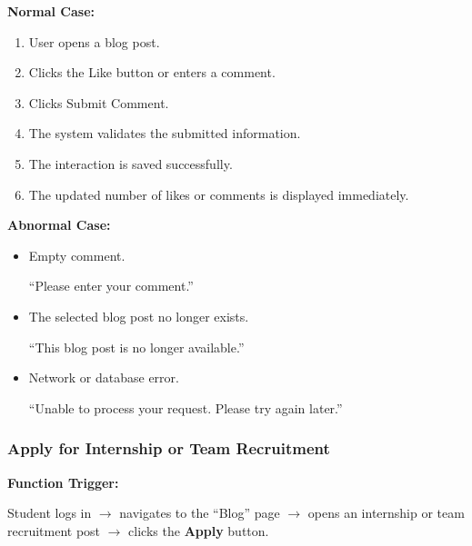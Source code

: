 \vspace{0.2cm}

\textbf{Normal Case:}

\begin{enumerate}
    \item User opens a blog post.
    \item Clicks the Like button or enters a comment.
    \item Clicks Submit Comment.
    \item The system validates the submitted information.
    \item The interaction is saved successfully.
    \item The updated number of likes or comments is displayed immediately.
\end{enumerate}

\vspace{0.2cm}

\textbf{Abnormal Case:}

\begin{itemize}
    \item Empty comment.

    ``Please enter your comment.''

    \item The selected blog post no longer exists.

    ``This blog post is no longer available.''

    \item Network or database error.

    ``Unable to process your request. Please try again later.''
\end{itemize}


\subsubsection{Apply for Internship or Team Recruitment}

\textbf{Function Trigger:}

Student logs in $\rightarrow$ navigates to the ``Blog'' page $\rightarrow$ opens an internship or team recruitment post $\rightarrow$ clicks the \textbf{Apply} button.

